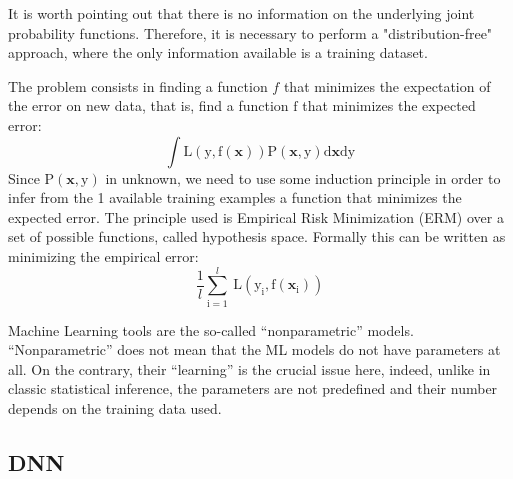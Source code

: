 \documentclass[a4,12pt]{article}
\begin{document}
It is worth pointing out that there is no information on the underlying joint probability functions. Therefore, it is necessary to perform a "distribution-free" approach, where the only information available is a training dataset.

The problem consists in finding a function $f$ that minimizes the expectation of the error on new data, that is, find a function $\mathrm{f}$ that minimizes the expected error:
$$
\int \mathrm{L}(\mathrm{y}, \mathrm{f}(\mathbf{x})) \mathrm{P}(\mathbf{x}, \mathrm{y}) \mathrm{d} \mathbf{x} \mathrm{dy}
$$
Since $\mathrm{P}(\mathbf{x}, \mathrm{y})$ in unknown, we need to use some induction principle in order to infer from the 1 available training examples a function that minimizes the expected error. The principle used is Empirical Risk Minimization (ERM) over a set of possible functions, called hypothesis space. Formally this can be written as minimizing the empirical error:
$$
\frac{1}{l} \sum_{\mathrm{i}=1}^{l} \mathrm{~L}\left(\mathrm{y}_{\mathrm{i}}, \mathrm{f}\left(\mathbf{x}_{\mathrm{i}}\right)\right)
$$

Machine Learning tools are the so-called “nonparametric” models. “Nonparametric” does not mean that the ML models do not have parameters at all. On the contrary, their “learning” is the crucial issue here, indeed, unlike in classic statistical inference, the parameters are not predefined and their number depends on the training data used. 


\subsection{DNN}
\end{document}
